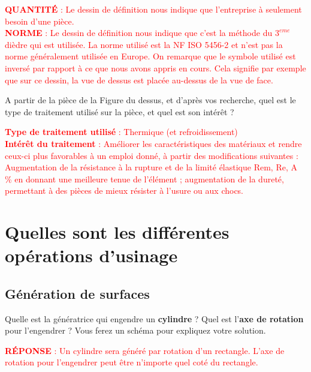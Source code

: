 \documentclass[12pt,a4paper]{article} %
\begin{document}
\textcolor{red}{\textbf{QUANTITÉ} : Le dessin de définition nous indique que l'entreprise à seulement besoin d'une pièce.} \\
\textcolor{red}{\textbf{NORME} : Le dessin de définition nous indique que c'est la méthode du $3^{eme}$ dièdre qui est utilisée. La norme utilisé est la NF ISO 5456-2 et n'est pas la norme généralement utilisée en Europe. On remarque que le symbole utilisé est inversé par rapport à ce que nous avons appris en cours. Cela signifie par exemple que sur ce dessin, la vue de dessus est placée au-dessus de la vue de face.}


\newpage


\begin{exo} A partir de la pièce de la Figure du dessus, et d'après vos recherche, quel est le type de traitement utilisé sur la pièce, et quel est son intérêt ? \end{exo}

\textcolor{red}{\textbf{Type de traitement utilisé} : Thermique (et refroidissement)} \\


\marginnote{1 pt}
\textcolor{red}{\textbf{Intérêt du traitement} : Améliorer les caractéristiques des matériaux et rendre ceux-ci plus favorables à un emploi donné, à partir des modifications suivantes : Augmentation de la résistance à la rupture et de la limité élastique Rem, Re,
A \% en donnant une meilleure tenue de l'élément ; augmentation de la dureté, permettant à des pièces de mieux résister à l'usure ou aux chocs.}

\section{Quelles sont les différentes opérations d'usinage}
\subsection{Génération de surfaces}


\begin{exo} Quelle est la génératrice qui engendre un \textbf{cylindre} ? Quel est l'\textbf{axe de rotation} pour l'engendrer ? Vous ferez un schéma pour expliquez votre solution.\end{exo}

\textcolor{red}{\textbf{RÉPONSE} : Un cylindre sera généré par rotation d'un rectangle. L'axe de rotation pour l'engendrer peut être n'importe quel coté du rectangle.} \\
\end{document}
